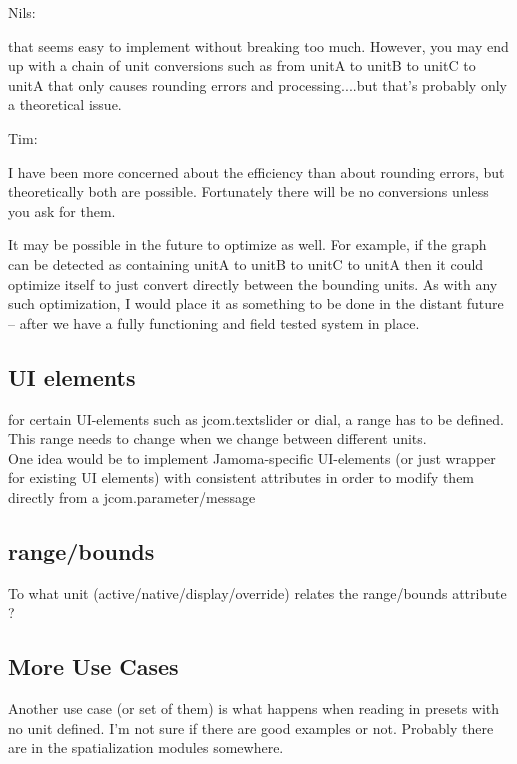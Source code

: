 \documentclass[]{article}
\begin{document}
Nils:

that seems easy to implement without breaking too much. However, you may end up with a chain of unit conversions such as from unitA to unitB to unitC to unitA that only causes rounding errors and processing....but that's probably only a theoretical issue.

Tim:

I have been more concerned about the efficiency than about rounding errors, but theoretically both are possible.  Fortunately there will be no conversions unless you ask for them.  

It may be possible in the future to optimize as well.  For example, if the graph can be detected as containing unitA to unitB to unitC to unitA then it could optimize itself to just convert directly between the bounding units.  As with any such optimization, I would place it as something to be done in the distant future -- after we have a fully functioning and field tested system in place.
 
\subsection{UI elements}
for certain UI-elements such as jcom.textslider or dial, a range has to be defined. This range needs to change when we change between different units.\\
One idea would be to implement Jamoma-specific UI-elements (or just wrapper for existing UI elements) with consistent attributes in order to modify them directly from a jcom.parameter/message                                                                                                                                               

\subsection{range/bounds}
To what unit (active/native/display/override) relates the range/bounds attribute ?

\subsection{More Use Cases}

Another use case (or set of them) is what happens when reading in presets with no unit defined.  I'm not sure if there are good examples or not.  Probably there are in the spatialization modules somewhere.







\end{document}
